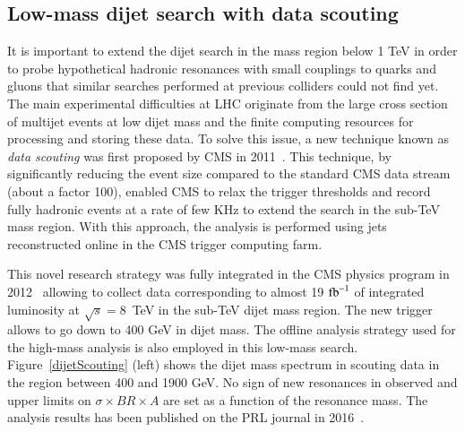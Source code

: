 \documentclass[epj]{webofc}
\begin{document}
\subsection{Low-mass dijet search with data scouting}
It is important to extend the dijet search in the mass region below 1
TeV in order to probe hypothetical hadronic resonances with small
couplings to quarks and gluons that similar searches performed at previous
colliders could not find yet. The main experimental difficulties at LHC originate
from the large cross section of multijet events at low dijet mass 
and the finite computing resources for processing and storing these
data. To solve this issue, a new technique known as 
{\it data scouting} was first proposed by CMS in 2011~\cite{CMS:2012cza}. 
This technique, by significantly reducing the event size
compared to the standard CMS data stream (about a factor 100), enabled CMS to relax the
trigger thresholds and record fully hadronic events at a rate of few
KHz to extend the search in the sub-TeV mass region. With this approach, the
analysis is performed using jets reconstructed online in the CMS
trigger computing farm. 

This novel research strategy was fully integrated in the CMS physics program in
2012~\cite{CMS:2012ooa} allowing to collect data corresponding to almost 19 $\rm{fb}^{-1}$ of
integrated luminosity at $\sqrt{s}=8$~TeV in the sub-TeV dijet mass
region. The new trigger allows to go down to 400 GeV in dijet mass. 
The offline analysis strategy used for the high-mass analysis is also employed
in this low-mass search. Figure~\ref{dijetScouting} (left) shows the dijet mass spectrum in scouting data in the
region between 400 and 1900 GeV. No sign of new resonances in observed and upper limits on 
$\sigma \times BR \times A$ are set as a function of the resonance
mass. The analysis results has been published on the PRL journal in 2016~\cite{Khachatryan:2016ecr}. 
\end{document}
